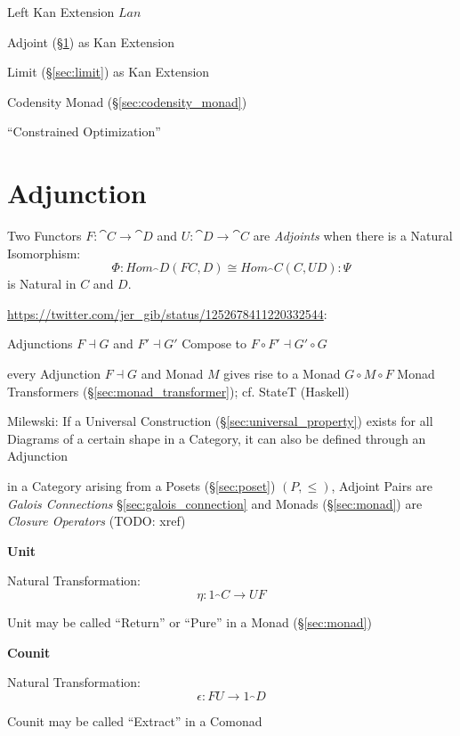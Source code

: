 Left Kan Extension $Lan$

Adjoint (\S\ref{sec:adjunction}) as Kan Extension

Limit (\S\ref{sec:limit}) as Kan Extension

Codensity Monad (\S\ref{sec:codensity_monad})

``Constrained Optimization'' %



\section{Adjunction}\label{sec:adjunction}


Two Functors $F : \cat{C} \rightarrow \cat{D}$ and $U : \cat{D}
\rightarrow \cat{C}$ are \emph{Adjoints} when there is a Natural
Isomorphism:
\[
  \Phi : Hom_\cat{D}(F C,D) \cong Hom_\cat{C}(C,U D) : \Psi
\]
is Natural in $C$ and $D$.

\url{https://twitter.com/jer_gib/status/1252678411220332544}:

Adjunctions $F \dashv G$ and $F' \dashv G'$ Compose to
$F \circ F' \dashv G' \circ G$

every Adjunction $F \dashv G$ and Monad $M$ gives rise to a Monad
$G \circ M \circ F$ \fist Monad Transformers (\S\ref{sec:monad_transformer});
cf. StateT (Haskell)

Milewski: If a Universal Construction (\S\ref{sec:universal_property})
exists for all Diagrams of a certain shape in a Category, it can also
be defined through an Adjunction

\fist in a Category arising from a Posets (\S\ref{sec:poset}) $(P, \leq)$,
Adjoint Pairs are \emph{Galois Connections} \S\ref{sec:galois_connection} and
Monads (\S\ref{sec:monad}) are \emph{Closure Operators} (TODO: xref)

\textbf{Unit}

Natural Transformation:
\[
  \eta : 1_\cat{C} \rightarrow U F
\]

\fist Unit may be called ``Return'' or ``Pure'' in a Monad
(\S\ref{sec:monad})


\textbf{Counit}

Natural Transformation:
\[
  \epsilon : F U \rightarrow 1_\cat{D}
\]

\fist Counit may be called ``Extract'' in a Comonad


